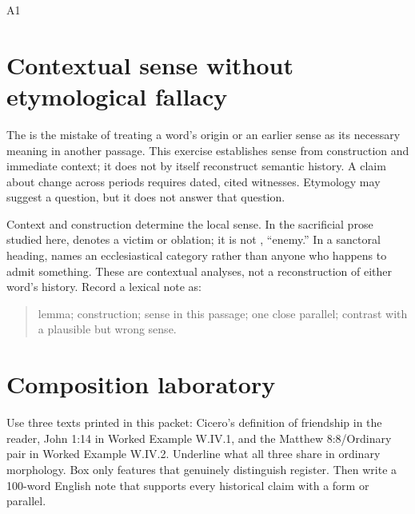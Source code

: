 \begin{courseunit}{A1}
\section{Contextual sense without etymological fallacy}

The  is the mistake of treating a word's origin or
an earlier sense as its necessary meaning in another passage. This exercise
establishes sense from construction and immediate context; it does not by
itself reconstruct semantic history. A claim about change across periods
requires dated, cited witnesses. Etymology may suggest a question, but it does
not answer that question.

Context and construction determine the local sense. In the sacrificial prose
studied here,  denotes a victim or oblation; it is not
, ``enemy.'' In a sanctoral heading,  names an
ecclesiastical category rather than anyone who happens to admit something.
These are contextual analyses, not a reconstruction of either word's history.
Record a lexical note as:

\begin{quote}
lemma; construction; sense in this passage; one close parallel; contrast with a
plausible but wrong sense.
\end{quote}

\section{Composition laboratory}

Use three texts printed in this packet: Cicero's definition of friendship in
the reader, John 1:14 in Worked Example W.IV.1, and the Matthew 8:8/Ordinary
pair in Worked Example W.IV.2. Underline what all three share in ordinary
morphology. Box only features that genuinely distinguish register. Then write
a 100-word English note that supports every historical claim with a form or
parallel.



\end{courseunit}

